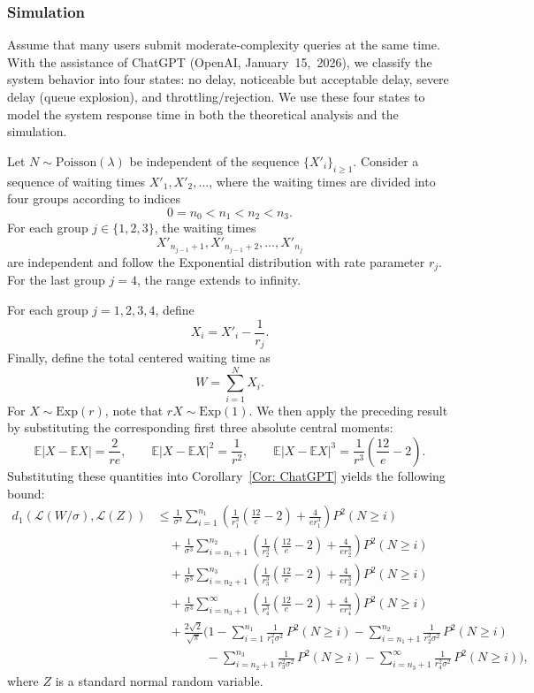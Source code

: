 \documentclass[pdflatex,sn-mathphys-ay]{sn-jnl}
\newcommand{\nn}{\nonumber}
\newcommand{\E}{\mathbb{E}}
\theoremstyle{thmstyleone}%
\theoremstyle{thmstyletwo}%
\theoremstyle{thmstylethree}%
\begin{document}
		
		\subsubsection{Simulation} 
        
Assume that many users submit moderate-complexity queries at the same time. 
With the assistance of ChatGPT (OpenAI, January~15,~2026), we classify 
the system behavior into four states: no delay, noticeable but acceptable delay, 
severe delay (queue explosion), and throttling/rejection. We use these four states to model the system response time in both the theoretical analysis and the simulation.

Let \( N \sim \mathrm{Poisson}(\lambda) \) be independent of the sequence \(\{X'_i\}_{i\geq 1}\).  
		Consider a sequence of waiting times \( X'_1, X'_2, \ldots \),
        where the waiting times are divided into four groups according to indices  
		\[
		0 = n_0< n_1 < n_2< n_3.
		\]
		For each group \( j \in \{1, 2, 3\} \), the waiting times  
		\[
		X'_{n_{j-1}+1}, X'_{n_{j-1}+2}, \ldots, X'_{n_j}
		\]
		are independent and follow the Exponential distribution with rate parameter \( r_j \).   For the last group \( j = 4 \), the range extends to infinity.
	
		For each group $j=1,2,3,4$, define
		\[
		X_i = X'_i - \frac{1}{r_j}.
		\]
		Finally, define the total centered waiting time as
		\[
		W = \sum_{i=1}^{N} X_i.
		\]
For $X\sim \mathrm{Exp}(r)$, note that $r X\sim \mathrm{Exp}(1)$.  We then apply the preceding result by
substituting the corresponding first three absolute central moments:
			\[
			  \E|X-\E X| = \frac{2}{r e},
            \qquad
			\E|X-\E X|^2 = \frac{1}{r^2}, \qquad
            \E|X-\E X|^3 = \frac{1}{r^3}\left(\frac{12}{e}-2\right).
			\]
Substituting these quantities into Corollary~\ref{Cor: ChatGPT} yields the following  bound: \begin{align}\label{sim:AI1}
				d_1\!\left(\mathcal{L}(W/\sigma), \mathcal{L}(Z) \right)
				&\le \frac{1}{\sigma^3} \sum_{i=1}^{n_{1}} 
				\left(\frac{1}{r_1^3}\left(\frac{12}{e}-2\right) + \frac{4}{er_1^3 }\right) P^2(N \ge i) \nn \\[4pt] 
				&\quad + \frac{1}{\sigma^3} \sum_{i=n_{1}+1}^{n_2} 
				\left(\frac{1}{r_2^3}\left(\frac{12}{e}-2\right) + \frac{4}{er_2^3 }\right) P^2(N \ge i) \nn\\[4pt]
				&\quad + \frac{1}{\sigma^3} \sum_{i=n_{2}+1}^{n_3} 
				\left(\frac{1}{r_3^3}\left(\frac{12}{e}-2\right) + \frac{4}{er_3^3 }  \right) P^2(N \ge i)\nn \\[4pt]
				&\quad + \frac{1}{\sigma^3} \sum_{i=n_{3}+1}^{\infty} 
				\left(\frac{1}{r_4^3}\left(\frac{12}{e}-2\right) + \frac{4}{er_4^3 }  \right) P^2(N \ge i)\nn \\[4pt]
				&\quad + \frac{2\sqrt{2}}{\sqrt{\pi}} 
				\Bigg(1 -\sum_{i=1}^{n_1}\frac{1}{r^2_1\sigma^2} \, {P}^2(N \ge i) -\sum_{i=n_1+1}^{n_2}\frac{1}{r^2_2\sigma^2} \, {P}^2(N \ge i) \nn\\
				&\quad\quad\quad\quad-\sum_{i=n_2+1}^{n_3}\frac{1}{r^2_3\sigma^2} \, {P}^2(N \ge i)-\sum_{i=n_3+1}^{\infty}\frac{1}{r^2_4\sigma^2} \, {P}^2(N \ge i)\Bigg),
			\end{align}
			where $Z$ is a standard normal random variable.
\end{document}
